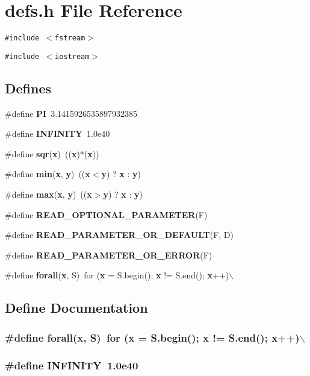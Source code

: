 \section{defs.h File Reference}
\label{defs_8h}
{\tt \#include $<$fstream$>$}\par
{\tt \#include $<$iostream$>$}\par
\subsection*{Defines}
\begin{CompactItemize}
\item 
\#define {\bf PI}\ 3.1415926535897932385
\item 
\#define {\bf INFINITY}\ 1.0e40
\item 
\#define {\bf sqr}({\bf x})\ (({\bf x})$\ast$({\bf x}))
\item 
\#define {\bf min}({\bf x}, {\bf y})\ (({\bf x}$<${\bf y}) ? {\bf x} : {\bf y})
\item 
\#define {\bf max}({\bf x}, {\bf y})\ (({\bf x}$>${\bf y}) ? {\bf x} : {\bf y})
\item 
\#define {\bf READ\_\-OPTIONAL\_\-PARAMETER}(F)
\item 
\#define {\bf READ\_\-PARAMETER\_\-OR\_\-DEFAULT}(F, D)
\item 
\#define {\bf READ\_\-PARAMETER\_\-OR\_\-ERROR}(F)
\item 
\#define {\bf forall}({\bf x}, S)\ for ({\bf x} = S.begin(); {\bf x} != S.end(); {\bf x}++)$\backslash$
\end{CompactItemize}


\subsection{Define Documentation}
\subsubsection{\setlength{\rightskip}{0pt plus 5cm}\#define forall({\bf x}, S)\ for ({\bf x} = S.begin(); {\bf x} != S.end(); {\bf x}++)$\backslash$}\label{defs_8h_a8}


\subsubsection{\setlength{\rightskip}{0pt plus 5cm}\#define INFINITY\ 1.0e40}\label{defs_8h_a1}


